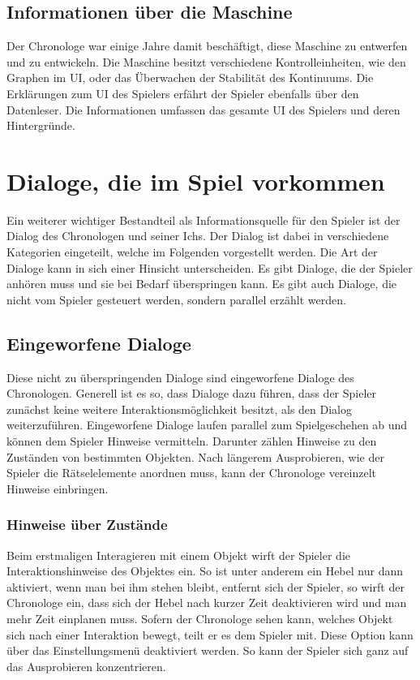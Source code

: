 \subsection{Informationen über die Maschine}
Der Chronologe war einige Jahre damit beschäftigt, diese Maschine zu entwerfen und zu entwickeln. Die Maschine besitzt verschiedene Kontrolleinheiten, wie den Graphen im \ac{UI}, oder das Überwachen der Stabilität des Kontinuums. Die Erklärungen zum \ac{UI} des Spielers erfährt der Spieler ebenfalls über den Datenleser. Die Informationen umfassen das gesamte \ac{UI} des Spielers und deren Hintergründe.

\section{Dialoge, die im Spiel vorkommen}
Ein weiterer wichtiger Bestandteil als Informationsquelle für den Spieler ist der Dialog des Chronologen und seiner Ichs. Der Dialog ist dabei in verschiedene Kategorien eingeteilt, welche im Folgenden vorgestellt werden.
Die Art der Dialoge kann in sich einer Hinsicht unterscheiden. Es gibt Dialoge, die der Spieler anhören muss und sie bei Bedarf überspringen kann. Es gibt auch Dialoge, die nicht vom Spieler gesteuert werden, sondern parallel erzählt werden.

\subsection{Eingeworfene Dialoge}
Diese nicht zu überspringenden Dialoge sind eingeworfene Dialoge des Chronologen. Generell ist es so, dass Dialoge dazu führen, dass der Spieler zunächst keine weitere Interaktionsmöglichkeit besitzt, als den Dialog weiterzuführen. Eingeworfene Dialoge laufen parallel zum Spielgeschehen ab und können dem Spieler Hinweise vermitteln. Darunter zählen Hinweise zu den Zuständen von bestimmten Objekten. Nach längerem Ausprobieren, wie der Spieler die Rätselelemente anordnen muss, kann der Chronologe vereinzelt Hinweise einbringen.

\subsubsection{Hinweise über Zustände}
Beim erstmaligen Interagieren mit einem Objekt wirft der Spieler die Interaktionshinweise des Objektes ein. So ist unter anderem ein Hebel nur dann aktiviert, wenn man bei ihm stehen bleibt, entfernt sich der Spieler, so wirft der Chronologe ein, dass sich der Hebel nach kurzer Zeit deaktivieren wird und man mehr Zeit einplanen muss. Sofern der Chronologe sehen kann, welches Objekt sich nach einer Interaktion bewegt, teilt er es dem Spieler mit. Diese Option kann über das Einstellungsmenü deaktiviert werden. So kann der Spieler sich ganz auf das Ausprobieren konzentrieren.

